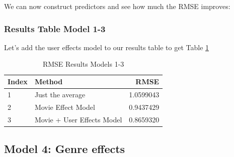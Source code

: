 \documentclass[
]{article}
\newenvironment{Shaded}{}{}
\newcommand{\AttributeTok}[1]{\textcolor[rgb]{0.49,0.56,0.16}{#1}}
\newcommand{\DecValTok}[1]{\textcolor[rgb]{0.25,0.63,0.44}{#1}}
\newcommand{\FloatTok}[1]{\textcolor[rgb]{0.25,0.63,0.44}{#1}}
\newcommand{\FunctionTok}[1]{\textcolor[rgb]{0.02,0.16,0.49}{#1}}
\newcommand{\NormalTok}[1]{#1}
\newcommand{\OtherTok}[1]{\textcolor[rgb]{0.00,0.44,0.13}{#1}}
\newcommand{\SpecialCharTok}[1]{\textcolor[rgb]{0.25,0.44,0.63}{#1}}
\newcommand{\StringTok}[1]{\textcolor[rgb]{0.25,0.44,0.63}{#1}}
\begin{document}
We can now construct predictors and see how much the RMSE improves:

\begin{Shaded}
\end{Shaded}

\newpage

\hypertarget{results-table-model-1-3}{%
\subsubsection{Results Table Model 1-3}\label{results-table-model-1-3}}

Let's add the user effects model to our results table to get Table
\ref{tbl:rmse_results_model_1-3}

\begin{table}[H]

\caption{\label{tab:ue_6}RMSE Results Models 1-3\label{tbl:rmse_results_model_1-3}}
\centering
\fontsize{7}{9}\selectfont
\begin{tabular}[t]{llr}
\toprule
Index & Method & RMSE\\
\midrule
1 & Just the average & 1.0599043\\
2 & Movie Effect Model & 0.9437429\\
3 & Movie + User Effects Model & 0.8659320\\
\bottomrule
\end{tabular}
\end{table}

\newpage

\hypertarget{model-4-genre-effects}{%
\subsection{Model 4: Genre effects}\label{model-4-genre-effects}}
\end{document}
